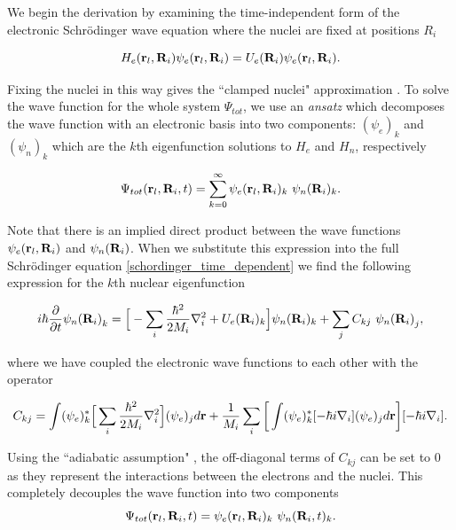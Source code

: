 We begin the derivation by examining the time-independent form of the electronic Schr\"odinger wave equation where the nuclei are fixed at positions $R_i$

\begin{equation}
	H_e(\bold{r}_l, \bold{R}_i)  \psi_e (\bold{r}_l,\bold{R}_i)  = U_e(\bold{R}_i) \psi_e (\bold{r}_l,\bold{R}_i).
\end{equation}

Fixing the nuclei in this way gives the ``clamped nuclei" approximation \cite{sherrill}. To solve the wave function for the whole system $\Psi_{tot}$, we use an \textit{ansatz} which decomposes the wave function with an electronic basis into two components: $({\psi_e})_k$ and $({\psi_n})_k$ which are the $k$th eigenfunction solutions to $H_e$ and $H_n$, respectively

\begin{equation}
	\Psi_{tot} (\bold{r}_l,\bold{R}_i, t) = \sum_{k=0}^\infty {\psi_e}(\bold{r}_l, \bold{R}_i)_k\ {\psi_n}(\bold{R}_i)_k.
\end{equation}

Note that there is an implied direct product between the wave functions $\psi_e(\bold{r}_l, \bold{R}_i)$ and $\psi_n(\bold{R}_i)$. When we substitute this expression into the full Schr\"odinger equation \ref{schordinger_time_dependent} we find the following expression for the $k$th nuclear eigenfunction \cite{miller1976} 

\begin{equation}
	i \hbar \frac{\partial} {\partial t} {\psi_n(\bold{R}_i)}_k = \Big[- \sum_i \frac{\hbar^2}{2M_i} \nabla^2_i  + {U_e} (\bold{R}_i)_k\Big] \psi_n (\bold{R}_i)_k + \sum_j C_{kj} \ {\psi_n(\bold{R}_i)}_j,
	\label{adiabatic_approx}
\end{equation}

where we have coupled the electronic wave functions to each other with the operator 

\begin{equation}
	C_{kj} = \int ({\psi_e})_k ^* \Big[\sum_i\frac{\hbar^2}{2M_i}\nabla^2_i\Big] ({\psi_e})_j d\bold{r}  + \frac{1}{M_i}\sum_{i}\bigg[ \int({\psi_e})_k ^* [-\hbar i \nabla_i]({\psi_e})_jd\bold{r}\bigg] [-\hbar i \nabla_i].
\end{equation}

Using the ``adiabatic assumption" \cite{miller1976}, the off-diagonal terms of $C_{kj}$ can be set to $0$ as they represent the interactions between the electrons and the nuclei. This completely decouples the wave function into two components 
\begin{equation}
	\Psi_{tot} (\bold{r}_l,\bold{R}_i, t) = {\psi_e}(\bold{r}_l, \bold{R}_i)_k\ {\psi_n}(\bold{R}_i,t)_k.
\end{equation}

